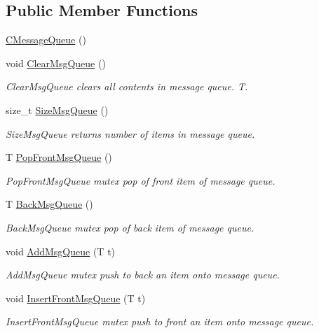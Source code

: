 \subsection*{Public Member Functions}
\begin{DoxyCompactItemize}
\item 
\hyperlink{classRCS_1_1CMessageQueue_afa0f086027abffe37b9e9673396f7b00}{C\-Message\-Queue} ()
\item 
void \hyperlink{classRCS_1_1CMessageQueue_a1fbabdd6e6aaf02572a93531ed871559}{Clear\-Msg\-Queue} ()
\begin{DoxyCompactList}\small\item\em Clear\-Msg\-Queue clears all contents in message queue. T. \end{DoxyCompactList}\item 
size\-\_\-t \hyperlink{classRCS_1_1CMessageQueue_a7929c4ce871eab3dfb8dfabd5bf4bdb9}{Size\-Msg\-Queue} ()
\begin{DoxyCompactList}\small\item\em Size\-Msg\-Queue returns number of items in message queue. \end{DoxyCompactList}\item 
T \hyperlink{classRCS_1_1CMessageQueue_afbde6b0fa4044557ba5f990c69d52ff7}{Pop\-Front\-Msg\-Queue} ()
\begin{DoxyCompactList}\small\item\em Pop\-Front\-Msg\-Queue mutex pop of front item of message queue. \end{DoxyCompactList}\item 
T \hyperlink{classRCS_1_1CMessageQueue_a5d669a3cecd23be9113567421f2b06a1}{Back\-Msg\-Queue} ()
\begin{DoxyCompactList}\small\item\em Back\-Msg\-Queue mutex pop of back item of message queue. \end{DoxyCompactList}\item 
void \hyperlink{classRCS_1_1CMessageQueue_a1f23fdbd7b3c7c3861abea8fb0899288}{Add\-Msg\-Queue} (T t)
\begin{DoxyCompactList}\small\item\em Add\-Msg\-Queue mutex push to back an item onto message queue. \end{DoxyCompactList}\item 
void \hyperlink{classRCS_1_1CMessageQueue_ab9a9aa2c8e05c74bd0b67dc2b576850f}{Insert\-Front\-Msg\-Queue} (T t)
\begin{DoxyCompactList}\small\item\em Insert\-Front\-Msg\-Queue mutex push to front an item onto message queue. \end{DoxyCompactList}\end{DoxyCompactItemize}
